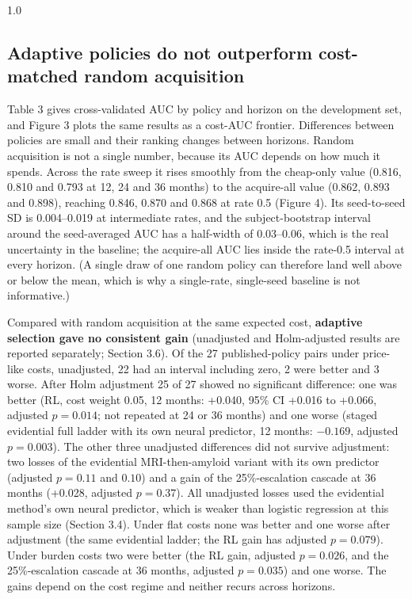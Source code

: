 \documentclass[12pt,twoside]{article}
\begin{document}
\begin{spacing}{1.0}
\subsection{Adaptive policies do not outperform cost-matched random acquisition}
Table 3 gives cross-validated AUC by policy and horizon on the development
set, and Figure 3 plots the same results as a cost-AUC frontier. Differences
between policies are small and their ranking changes between horizons.
Random acquisition is not a single number, because its AUC depends on how
much it spends. Across the rate sweep it rises smoothly from the cheap-only
value (0.816, 0.810 and 0.793 at 12, 24 and 36 months) to the acquire-all
value (0.862, 0.893 and 0.898), reaching 0.846, 0.870 and 0.868 at rate 0.5
(Figure 4). Its seed-to-seed SD is 0.004--0.019 at intermediate rates, and
the subject-bootstrap interval around the seed-averaged AUC has a half-width
of 0.03--0.06, which is the real uncertainty in the baseline; the
acquire-all AUC lies inside the rate-0.5 interval at every horizon. (A
single draw of one random policy can therefore land well above or below the
mean, which is why a single-rate, single-seed baseline is not informative.)

Compared with random acquisition at the same expected cost, \textbf{adaptive
selection gave no consistent gain} (unadjusted and Holm-adjusted results are reported separately; Section
3.6). Of the 27 published-policy pairs under price-like costs, unadjusted, 22 had an interval including zero,
2 were better and 3 worse. After Holm adjustment 25 of 27 showed no significant difference: one was better
(RL, cost weight 0.05, 12 months: +0.040, 95\% CI +0.016 to +0.066, adjusted $p=0.014$; not repeated at 24
or 36 months) and one worse (staged evidential full ladder with its own neural predictor, 12 months:
$-0.169$, adjusted $p=0.003$). The other three unadjusted differences did not survive adjustment: two losses
of the evidential MRI-then-amyloid variant with its own predictor (adjusted $p=0.11$ and $0.10$) and a gain
of the 25\%-escalation cascade at 36 months (+0.028, adjusted $p=0.37$). All unadjusted losses used the
evidential method's own neural predictor, which is weaker than logistic regression at this sample size
(Section 3.4). Under flat costs none was better and one worse after adjustment (the same evidential ladder;
the RL gain has adjusted $p=0.079$). Under burden costs two were better (the RL gain, adjusted $p=0.026$,
and the 25\%-escalation cascade at 36 months, adjusted $p=0.035$) and one worse. The gains depend on the
cost regime and neither recurs across horizons.


\end{spacing}
\end{document}
